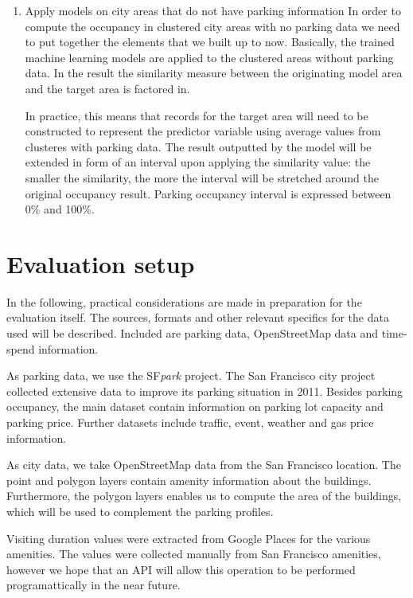 \documentclass{article}
\begin{document}
\begin{enumerate}[label=\Roman*]
		\item{Apply models on city areas that do not have parking information}
		In order to compute the occupancy in clustered city areas with no parking data we need to put together the elements that we built up to now. Basically, the trained machine learning models are applied to the clustered areas without parking data. In the result the similarity measure between the originating model area and the target area is factored in.
		
		In practice, this means that records for the target area will need to be constructed to represent the predictor variable using average values from clusteres with parking data. The result outputted by the model will be extended in form of an interval upon applying the similarity value: the smaller the similarity, the more the interval will be stretched around the original occupancy result. Parking occupancy interval is expressed between 0\% and 100\%.
		
	\end{enumerate}
	
	\section{Evaluation setup}
	In the following, practical considerations are made in preparation for the evaluation itself. The sources, formats and other relevant specifics for the data used will be described. Included are parking data, OpenStreetMap data and time-spend information.
	  
	As parking data, we use the SF\textit{park} project. The San Francisco city project collected extensive data to improve its parking situation in 2011. Besides parking occupancy, the main dataset contain information on parking lot capacity and parking price. Further datasets include traffic, event, weather and gas price information.
		
	As city data, we take OpenStreetMap data from the San Francisco location. The point and polygon layers contain amenity information about the buildings. Furthermore, the polygon layers enables us to compute the area of the buildings, which will be used to complement the parking profiles.
	
	Visiting duration values were extracted from Google Places for the various amenities. The values were collected manually from San Francisco amenities, however we hope that an API will allow this operation to be performed programattically in the near future.
	
\end{document}
